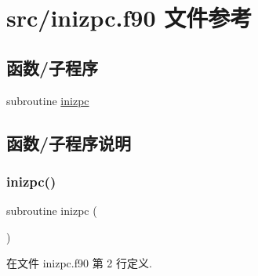 \hypertarget{inizpc_8f90}{}\section{src/inizpc.f90 文件参考}
\label{inizpc_8f90}
\subsection*{函数/子程序}
\begin{DoxyCompactItemize}
\item 
subroutine \mbox{\hyperlink{inizpc_8f90_a50e341ef3b4ebd37f09f3dd74d39f2c8}{inizpc}}
\end{DoxyCompactItemize}


\subsection{函数/子程序说明}
\mbox{\label{inizpc_8f90_a50e341ef3b4ebd37f09f3dd74d39f2c8}} 
\subsubsection{\texorpdfstring{inizpc()}{inizpc()}}
{\footnotesize\ttfamily subroutine inizpc (\begin{DoxyParamCaption}{ }\end{DoxyParamCaption})}



在文件 inizpc.\+f90 第 2 行定义.

